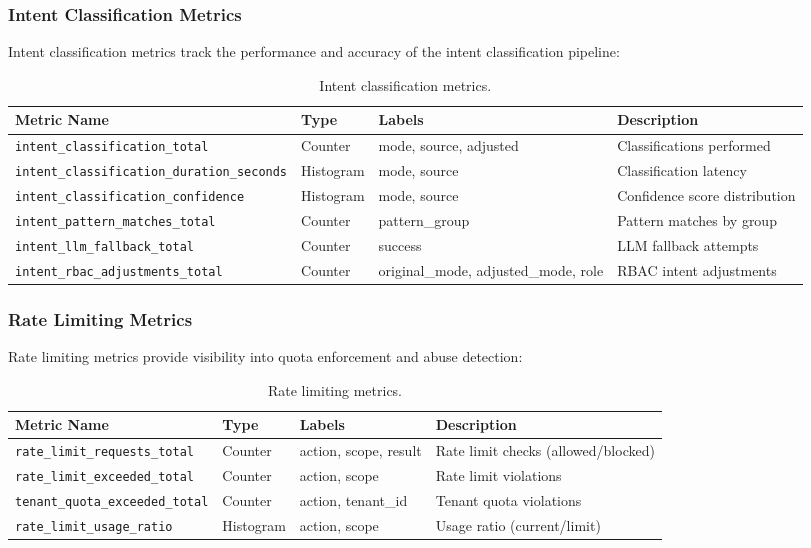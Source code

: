 \subsubsection{Intent Classification Metrics}

Intent classification metrics track the performance and accuracy of the intent classification pipeline:

\begin{table}[ht]
\centering
\caption{Intent classification metrics.}
\label{tab:intent-metrics}
\small
\begin{tabularx}{\textwidth}{lllX}
\hline
\textbf{Metric Name} & \textbf{Type} & \textbf{Labels} & \textbf{Description} \\
\hline
\texttt{intent\_classification\_total} & Counter & mode, source, adjusted & Classifications performed \\
\texttt{intent\_classification\_duration\_seconds} & Histogram & mode, source & Classification latency \\
\texttt{intent\_classification\_confidence} & Histogram & mode, source & Confidence score distribution \\
\texttt{intent\_pattern\_matches\_total} & Counter & pattern\_group & Pattern matches by group \\
\texttt{intent\_llm\_fallback\_total} & Counter & success & LLM fallback attempts \\
\texttt{intent\_rbac\_adjustments\_total} & Counter & original\_mode, adjusted\_mode, role & RBAC intent adjustments \\
\hline
\end{tabularx}
\end{table}

\subsubsection{Rate Limiting Metrics}

Rate limiting metrics provide visibility into quota enforcement and abuse detection:

\begin{table}[ht]
\centering
\caption{Rate limiting metrics.}
\label{tab:rate-limit-metrics}
\small
\begin{tabularx}{\textwidth}{lllX}
\hline
\textbf{Metric Name} & \textbf{Type} & \textbf{Labels} & \textbf{Description} \\
\hline
\texttt{rate\_limit\_requests\_total} & Counter & action, scope, result & Rate limit checks (allowed/blocked) \\
\texttt{rate\_limit\_exceeded\_total} & Counter & action, scope & Rate limit violations \\
\texttt{tenant\_quota\_exceeded\_total} & Counter & action, tenant\_id & Tenant quota violations \\
\texttt{rate\_limit\_usage\_ratio} & Histogram & action, scope & Usage ratio (current/limit) \\
\hline
\end{tabularx}
\end{table}

